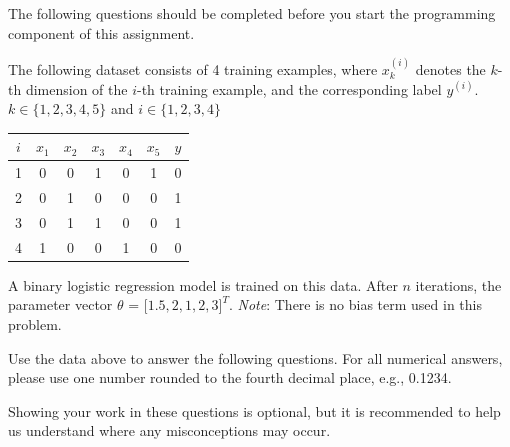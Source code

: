 \documentclass[11pt,addpoints,answers]{exam}
\begin{document}
The following questions should be completed before you start the programming component of this assignment.

The following dataset consists of 4 training examples, where $x_k^{(i)}$ denotes the $k$-th dimension of the $i$-th training example, and the corresponding label $y^{(i)}$. $k \in \{1, 2, 3, 4, 5\}$ and $i \in \{1, 2, 3, 4\}$

\begin{center}
\begin{tabular}{|c|c|c|c|c|c|c|}
\hline
$i$ & $x_{1}$ & $x_{2}$ & $x_{3}$ & $x_{4}$ & $x_{5}$ & $y$ \\ \hline
1 & 0 & 0 & 1 & 0 & 1 & 0   \\ \hline
2 & 0 & 1 & 0 & 0 & 0 & 1     \\ \hline
3 & 0 & 1 & 1 & 0 & 0 & 1    \\ \hline
4 & 1 & 0 & 0 & 1 & 0 & 0   \\ \hline

\end{tabular}
\end{center}

A binary logistic regression model is trained on this data. After $n$ iterations, the parameter vector $\theta$ = $\lbrack 1.5, 2, 1, 2, 3 \rbrack^T$. \textit{Note}: There is no bias term used in this problem.

Use the data above to answer the following questions. For all numerical answers, please use one number rounded to the  fourth decimal place, e.g., 0.1234.

Showing your work in these questions is optional, but it is recommended to help us understand where any misconceptions may occur.
\end{document}
